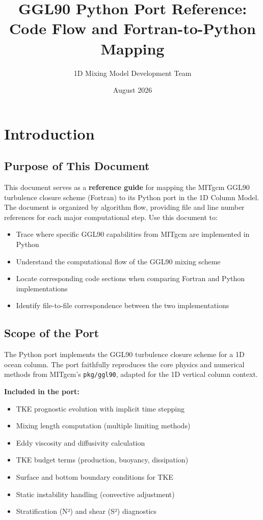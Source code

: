 \documentclass[11pt]{article}
\title{GGL90 Python Port Reference:\\
       Code Flow and Fortran-to-Python Mapping}
\author{1D Mixing Model Development Team}
\date{August 2026}
\begin{document}
\maketitle
\tableofcontents
\newpage

\section{Introduction}
\label{sec:introduction}

\subsection{Purpose of This Document}

This document serves as a \textbf{reference guide} for mapping the MITgcm GGL90 turbulence closure scheme (Fortran) to its Python port in the 1D Column Model. The document is organized by algorithm flow, providing file and line number references for each major computational step. Use this document to:

\begin{itemize}
    \item Trace where specific GGL90 capabilities from MITgcm are implemented in Python
    \item Understand the computational flow of the GGL90 mixing scheme
    \item Locate corresponding code sections when comparing Fortran and Python implementations
    \item Identify file-to-file correspondence between the two implementations
\end{itemize}

\subsection{Scope of the Port}

The Python port implements the GGL90 turbulence closure scheme for a 1D ocean column. The port faithfully reproduces the core physics and numerical methods from MITgcm's \verb|pkg/ggl90|, adapted for the 1D vertical column context.

\textbf{Included in the port:}
\begin{itemize}
    \item TKE prognostic evolution with implicit time stepping
    \item Mixing length computation (multiple limiting methods)
    \item Eddy viscosity and diffusivity calculation
    \item TKE budget terms (production, buoyancy, dissipation)
    \item Surface and bottom boundary conditions for TKE
    \item Static instability handling (convective adjustment)
    \item Stratification (N²) and shear (S²) diagnostics
\end{itemize}
\end{document}

